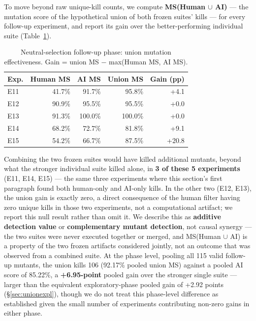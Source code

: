 \documentclass[10pt,conference]{IEEEtran}
\begin{document}
To move beyond raw unique-kill counts, we compute \textbf{MS(Human $\cup$ AI)} — the mutation score of the hypothetical union of both frozen suites' kills — for every follow-up experiment, and report its gain over the better-performing individual suite (Table~\ref{tab:unionfollowup}).

\begin{table}[ht]
\centering
\caption{Neutral-selection follow-up phase: union mutation effectiveness. Gain = union MS $-$ max(Human MS, AI MS).}
\label{tab:unionfollowup}
\small
\begin{tabular}{lrrrr}
\toprule
Exp. & Human MS & AI MS & Union MS & Gain (pp) \\
\midrule
E11 & 41.7\% & 91.7\% & 95.8\% & +4.1 \\
E12 & 90.9\% & 95.5\% & 95.5\% & +0.0 \\
E13 & 91.3\% & 100.0\% & 100.0\% & +0.0 \\
E14 & 68.2\% & 72.7\% & 81.8\% & +9.1 \\
E15 & 54.2\% & 66.7\% & 87.5\% & +20.8 \\
\bottomrule
\end{tabular}
\end{table}

Combining the two frozen suites would have killed additional mutants, beyond what the stronger individual suite killed alone, in \textbf{3 of these 5 experiments} (E11, E14, E15) — the same three experiments where this section's first paragraph found both human-only and AI-only kills. In the other two (E12, E13), the union gain is exactly zero, a direct consequence of the human filter having zero unique kills in those two experiments, not a computational artifact; we report this null result rather than omit it. We describe this as \textbf{additive detection value} or \textbf{complementary mutant detection}, not causal synergy — the two suites were never executed together or merged, and MS(Human $\cup$ AI) is a property of the two frozen artifacts considered jointly, not an outcome that was observed from a combined suite. At the phase level, pooling all 115 valid follow-up mutants, the union kills 106 (92.17\% pooled union MS) against a pooled AI score of 85.22\%, a \textbf{+6.95-point} pooled gain over the stronger single suite — larger than the equivalent exploratory-phase pooled gain of +2.92 points (\S\ref{sec:unionexpl}), though we do not treat this phase-level difference as established given the small number of experiments contributing non-zero gains in either phase.
\end{document}
